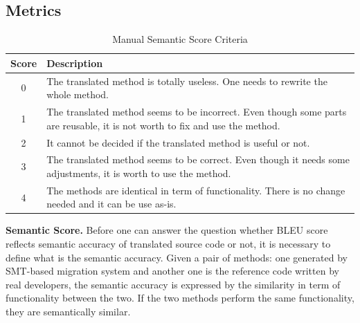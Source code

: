 \subsection{Metrics}

\begin{table}
\begin{tabular}{|c|p{6.5cm}|}
\hline
Score & Description \\
\hline
0 & The translated method is totally useless. One needs to rewrite the whole method. \\
\hline
1 & The translated method seems to be incorrect. Even though some parts are reusable, it is not worth to fix and use the method. \\
\hline
2 &  It cannot be decided if the translated method is useful or not. \\
\hline
3 & The translated method seems to be correct. Even though it needs some adjustments, it is worth to use the method. \\
\hline
4 & The methods are identical in term of functionality. There is no change needed and it can be use as-is. \\
\hline
\end{tabular}
\caption{Manual Semantic Score Criteria}
\label{table:criteria}
\end{table}

\textbf{Semantic Score.}
Before one can answer the question whether BLEU score reflects semantic accuracy of translated source code or not, it is necessary to define what is the semantic accuracy. Given a pair of methods: one generated by SMT-based migration system and another one is the reference code written by real developers, the semantic accuracy is expressed by the similarity in term of functionality between the two. If the two methods perform the same functionality, they are semantically similar.


